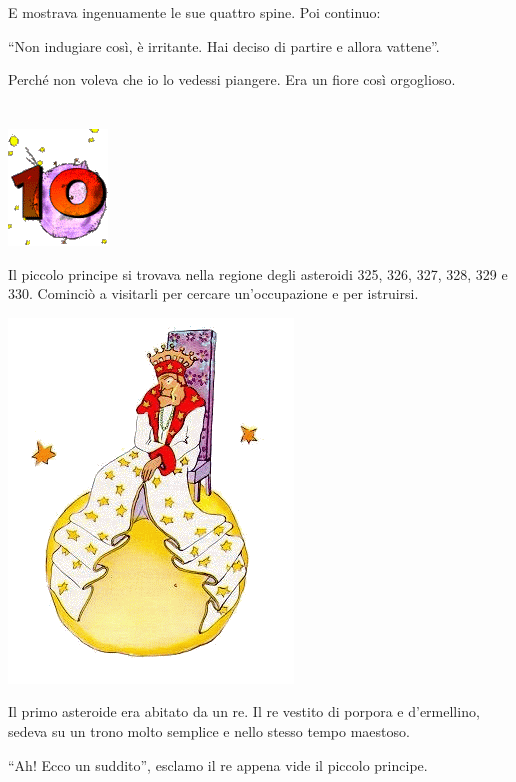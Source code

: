 \documentclass[11pt]{scrbook}
\begin{document}
E mostrava ingenuamente le sue quattro spine. Poi continuo:

``Non indugiare così, è irritante. Hai deciso di partire e allora vattene''.

Perché non voleva che io lo vedessi piangere. Era un fiore così orgoglioso.

\chapter{}
\begin{center}
\includegraphics{img/chapter10}
\end{center}

Il piccolo principe si trovava nella regione degli asteroidi 325, 326, 327, 328, 329 e 330. Cominciò a visitarli per cercare un'occupazione e per istruirsi.

\begin{center}
\includegraphics{img/10a}
\end{center}

Il primo asteroide era abitato da un re. Il re vestito di porpora e d'ermellino, sedeva su un trono molto semplice e nello stesso tempo maestoso.

``Ah! Ecco un suddito'', esclamo il re appena vide il piccolo principe.
\end{document}
